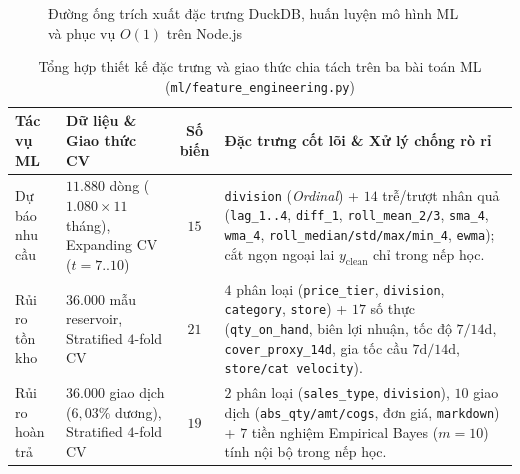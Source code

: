 \begin{figure}[H]
	\centering
	\caption{Đường ống trích xuất đặc trưng DuckDB, huấn luyện mô hình ML và phục vụ $O(1)$ trên Node.js}
	\label{fig:ml_pipeline_detail}
\end{figure}

\begin{table}[H]
	\centering
	\caption{Tổng hợp thiết kế đặc trưng và giao thức chia tách trên ba bài toán ML (\texttt{ml/feature\_engineering.py})}
	\label{tab:ml-features}
	\footnotesize
	\setlength{\tabcolsep}{3.5pt}
	\begin{tabular}{l p{5cm} c p{8cm}}
		\toprule
		\textbf{Tác vụ ML} & \textbf{Dữ liệu \& Giao thức CV}                                  & \textbf{Số biến} & \textbf{Đặc trưng cốt lõi \& Xử lý chống rò rỉ}                                                                                                                                                                                                                                                                                                                                                   \\
		\midrule
		Dự báo nhu cầu     & $11.880$ dòng ($1.080 \times 11$ tháng), Expanding CV ($t=7..10$) & $15$             & \texttt{division} (\textit{Ordinal}) + $14$ trễ/trượt nhân quả (\texttt{lag_1..4}, \texttt{diff_1}, \texttt{roll_mean_2/3}, \texttt{sma_4}, \texttt{wma_4}, \texttt{roll\_median/\allowbreak{}std/\allowbreak{}max/\allowbreak{}min\_4}, \texttt{ewma}); cắt ngọn ngoại lai $y_{\text{clean}}$ chỉ trong nếp học. \\
		Rủi ro tồn kho     & $36.000$ mẫu reservoir, Stratified $4$-fold CV                    & $21$             & $4$ phân loại (\texttt{price_tier}, \texttt{division}, \texttt{category}, \texttt{store}) + $17$ số thực (\texttt{qty_on_hand}, biên lợi nhuận, tốc độ $7/14$d, \texttt{cover_proxy_14d}, gia tốc cầu $7\text{d}/14\text{d}$, \texttt{store/cat velocity}).                                                            \\
		Rủi ro hoàn trả    & $36.000$ giao dịch ($6{,}03\%$ dương), Stratified $4$-fold CV     & $19$             & $2$ phân loại (\texttt{sales_type}, \texttt{division}), $10$ giao dịch (\texttt{abs_qty/amt/cogs}, đơn giá, \texttt{markdown}) + $7$ tiền nghiệm Empirical Bayes ($m=10$) tính nội bộ trong nếp học.                                                                                                                                                      \\
		\bottomrule
	\end{tabular}
\end{table}

